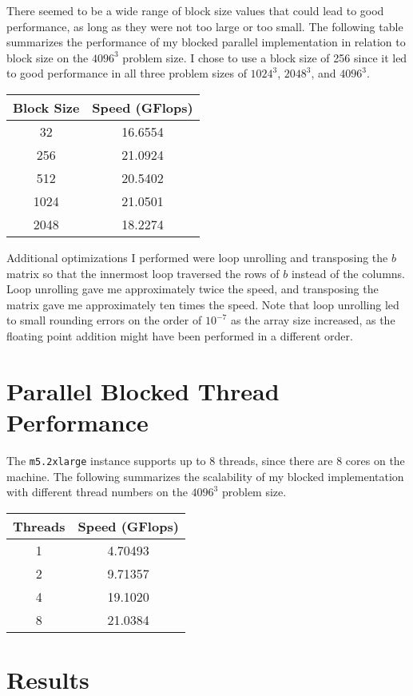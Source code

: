 \documentclass[12pt]{article}
\begin{document}
There seemed to be a wide range of block size values that could lead to good performance,
as long as they were not too large or too small. The following table summarizes the performance
of my blocked parallel implementation in relation to block size on the \(4096^3\) problem size.
I chose to use a block size of 256 since it led to good performance in all three problem sizes
of \(1024^3\), \(2048^3\), and \(4096^3\).
\begin{center}
    \begin{tabular} {c|c}
        Block Size & Speed (GFlops)\\
        \hline
        32 & 16.6554\\
        256 & 21.0924\\
        512 & 20.5402\\
        1024 & 21.0501\\
        2048 & 18.2274
    \end{tabular}
\end{center}
Additional optimizations I performed were loop unrolling and transposing the \(b\) matrix so that the innermost
loop traversed the rows of \(b\) instead of the columns. Loop unrolling gave me approximately twice the speed,
and transposing the matrix gave me approximately ten times the speed. Note that loop unrolling led to small
rounding errors on the order of \(10^{-7}\) as the array size increased, as the floating point addition might have
been performed in a different order.

\section{Parallel Blocked Thread Performance}

The \texttt{m5.2xlarge} instance supports up to 8 threads, since there are 8 cores on the machine.
The following summarizes the scalability of my blocked implementation with different thread numbers on the
\(4096^3\) problem size.
\begin{center}
    \begin{tabular} {c|c}
        Threads & Speed (GFlops)\\
        \hline
        1 & 4.70493\\
        2 & 9.71357\\
        4 & 19.1020\\
        8 & 21.0384
    \end{tabular}
\end{center}

\section{Results}
\end{document}
